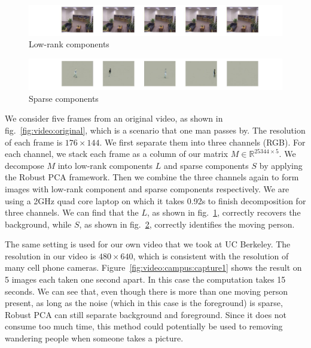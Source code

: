 \begin{figure}[h]
  \centering
  \includegraphics[width=1\textwidth]{../figures/SwitchLight_low_rank.pdf}
  \caption{Low-rank components}
  \label{fig:video:low_rank}
\end{figure}

\begin{figure}[h]
  \centering
  \includegraphics[width=1\textwidth]{../figures/SwitchLight_sparse.pdf}
  \caption{Sparse components}
  \label{fig:video:sparse}
\end{figure}

We consider five frames from an original video, as shown in fig.~\ref{fig:video:original}, which is a scenario that  one man passes by. The resolution of each frame is $176\times144$. We first separate them into three channels (RGB). For each channel, we stack each frame as a column  of our matrix $M\in\mathbb{R}^{25344\times5}$. We decompose $M$ into low-rank components $L$ and sparse components $S$ by applying the Robust PCA framework. Then we combine the three channels again to form images with low-rank component and sparse components respectively. We are using a 2GHz quad core laptop on which it takes 0.92s to finish decomposition for three channels. We can find that the $L$, as shown in fig.~\ref{fig:video:low_rank}, correctly recovers the background, while $S$, as shown in fig.~\ref{fig:video:sparse}, correctly identifies the moving person.

The same setting is used for our own video that we took at UC Berkeley. The resolution in our video is $480\times640$, which is consistent with the resolution of many cell phone cameras. Figure~\ref{fig:video:campus:capture1} shows the result on 5 images each taken one second apart. In this case the computation takes 15 seconds. We can see that, even though there is more than one moving person present, as long as the noise (which in this case is the foreground) is sparse, Robust PCA can still separate background and foreground. Since it does not consume too much time, this method could potentially be used to removing wandering people when someone takes a picture.

